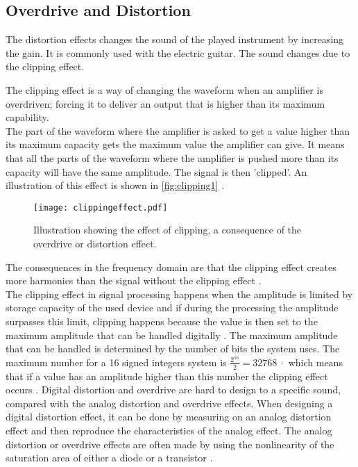 \subsection{Overdrive and Distortion} 

The distortion effects changes the sound of the played instrument by increasing the gain. It is commonly used with the electric guitar. The sound changes due to the clipping effect. \\

The clipping effect is a way of changing the waveform when an amplifier is overdriven; forcing it to deliver an output that is higher than its maximum capability. \\
The part of the waveform where the amplifier is asked to get a value higher than its maximum capacity gets the maximum value the amplifier can give. It means that all the parts of the waveform where the amplifier is pushed more than its capacity will have the same amplitude. The signal is then 'clipped'. An illustration of this effect is shown in \autoref{fig:clipping1} \citep{distortion_clipping1}.\\

\begin{figure} [htbp]
	\centering
  \texttt{[image: clippingeffect.pdf]}
  \caption{Illustration showing the effect of clipping, a consequence of the overdrive or distortion effect.}
  \label{fig:clipping1}
\end{figure} \citep{distortion_clipping1}


The consequences in the frequency domain are that the clipping effect creates more harmonics than the signal without the clipping effect \citep{distortion_harmonics}. \\

The clipping effect in signal processing happens when the amplitude is limited by storage capacity of the used device and if during the processing the amplitude surpasses this limit, clipping happens because the value is then set to the maximum amplitude that can be handled digitally \citep{distortion_digital}. The maximum amplitude that can be handled is determined by the number of bits the system uses. The maximum number for a \SI{16}{\bit}  signed integers system is $\frac{2^{16}}{2} = \SI{32768}{\cdot}$ which means that if a value has an amplitude higher than this number the clipping effect occurs \citep{distortion_digitalcalc}. 
Digital distortion and overdrive are hard to design to a specific sound, compared with the analog distortion and overdrive effects. When designing a digital distortion effect, it can be done by measuring on an analog distortion effect and then reproduce the characteristics of the analog effect. The analog distortion or overdrive effects are often made by using the nonlinearity of the saturation area of either a diode or a transistor \citep{CCRMA}. 

